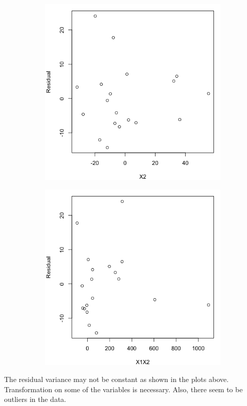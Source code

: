\documentclass[10pt]{report}
\begin{document}
\begin{enumerate}[a.]
\begin{figure}[H]
\begin{subfigure}[b]{.25\linewidth}
		\end{subfigure}%
		\begin{subfigure}[b]{.25\linewidth}
			\includegraphics[width=\linewidth]{p4/20a_x2.png} 
		\end{subfigure}%
		\begin{subfigure}[b]{.25\linewidth}
			\includegraphics[width=\linewidth]{p4/20a_x1x2.png} 
		\end{subfigure}
	\end{figure}
	The residual variance may not be constant as shown in the plots above. Transformation on some of the variables is necessary. Also, there seem to be outliers in the data.
	

\end{enumerate}
\end{document}

